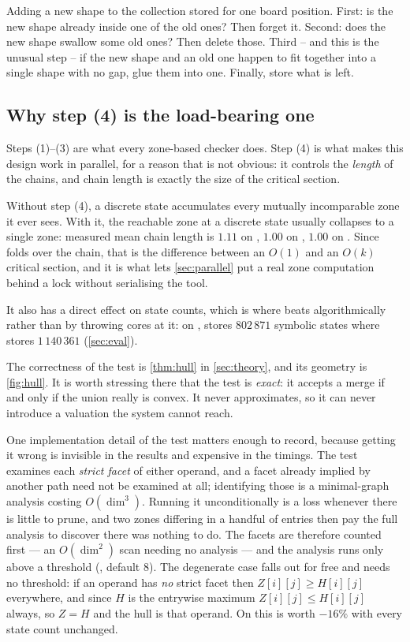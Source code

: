 \begin{intuition}
Adding a new shape to the collection stored for one board position.  First:
is the new shape already inside one of the old ones?  Then forget it.  Second:
does the new shape swallow some old ones?  Then delete those.  Third -- and
this is the unusual step -- if the new shape and an old one happen to fit
together into a single shape with no gap, glue them into one.  Finally, store
what is left.
\end{intuition}

\subsection{Why step (4) is the load-bearing one}

Steps (1)--(3) are what every zone-based checker does.  Step (4) is what makes
this design work in parallel, for a reason that is not obvious: it controls the
\emph{length} of the chains, and chain length is exactly the size of the
critical section.

Without step (4), a discrete state accumulates every mutually incomparable zone
it ever sees.  With it, the reachable zone at a discrete state usually
collapses to a single zone: measured mean chain length is $1.11$ on
, $1.00$ on , $1.00$ on .  Since
 folds over the chain, that is the difference between an $O(1)$ and
an $O(k)$ critical section, and it is what lets \cref{sec:parallel} put a real
zone computation behind a lock without serialising the tool.

It also has a direct effect on state counts, which is where \tool{} beats
\uppaal{} algorithmically rather than by throwing cores at it: on
, \tool{} stores $802\,871$ symbolic states where \uppaal{} stores
$1\,140\,361$ (\cref{sec:eval}).

The correctness of the test is \cref{thm:hull} in \cref{sec:theory}, and its
geometry is \cref{fig:hull}.  It is worth stressing there that the test is
\emph{exact}: it accepts a merge if and only if the union really is convex.  It
never approximates, so it can never introduce a valuation the system cannot
reach.


One implementation detail of the test matters enough to record, because getting
it wrong is invisible in the results and expensive in the timings.  The test
examines each \emph{strict facet} of either operand, and a facet already implied
by another path need not be examined at all; identifying those is a
minimal-graph analysis costing $O(\dim^3)$.  Running it unconditionally is a
loss whenever there is little to prune, and two zones differing in a handful of
entries then pay the full analysis to discover there was nothing to do.  The
facets are therefore counted first --- an $O(\dim^2)$ scan needing no analysis
--- and the analysis runs only above a threshold
(, default $8$).  The degenerate case falls out for
free and needs no threshold: if an operand has \emph{no} strict facet then
$Z[i][j] \ge H[i][j]$ everywhere, and since $H$ is the entrywise maximum
$Z[i][j] \le H[i][j]$ always, so $Z = H$ and the hull is that operand.  On
 this is worth $-16\%$ with every state count unchanged.

